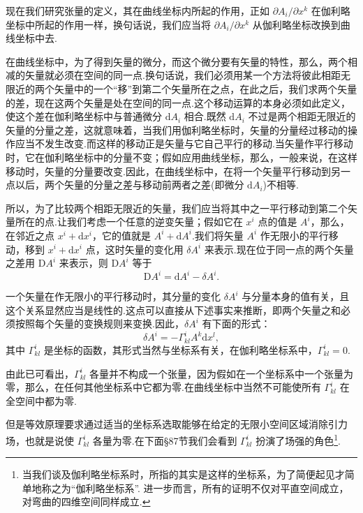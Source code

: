 现在我们研究张量的定义，其在曲线坐标内所起的作用，正如 $\partial A_i/\partial x^k$ 在伽利略坐标中所起的作用一样，换句话说，我们应当将 $\partial A_i/\partial x^k$ 从伽利略坐标改换到曲线坐标中去.

在曲线坐标中，为了得到矢量的微分，而这个微分要有矢量的特性，那么，两个相减的矢量就必须在空间的同一点.换句话说，我们必须用某一个方法将彼此相距无限近的两个矢量中的一个“移”到第二个矢量所在之点，在此之后，我们求两个矢量的差，现在这两个矢量是处在空间的同一点.这个移动运算的本身必须如此定义，使这个差在伽利略坐标中与普通微分 $\mathrm{d}A_i$ 相合.既然 $\mathrm{d}A_i$ 不过是两个相距无限近的矢量的分量之差，这就意味着，当我们用伽利略坐标时，矢量的分量经过移动的操作应当不发生改变.而这样的移动正是矢量与它自己平行的移动.当矢量作平行移动时，它在伽利略坐标中的分量不变；假如应用曲线坐标，那么，一般来说，在这样移动时，矢量的分量要改变.因此，在曲线坐标中，在将一个矢量平行移动到另一点以后，两个矢量的分量之差与移动前两者之差(即微分 $\mathrm{d}A_i$)不相等.

所以，为了比较两个相距无限近的矢量，我们应当将其中之一平行移动到第二个矢量所在的点.让我们考虑一个任意的逆变矢量；假如它在 $x^i$ 点的值是 $A^i$，那么，在邻近之点 $x^i+\mathrm{d}x^i$，它的值就是 $A^i+\mathrm{d}A^i$.我们将矢量 $A^i$ 作无限小的平行移动，移到 $x^i+\mathrm{d}x^i$ 点，这时矢量的变化用 $\delta A^i$ 来表示.现在位于同一点的两个矢量之差用 $\mathrm{D}A^i$ 来表示，则 $\mathrm{D}A^i$ 等于
\begin{equation}
  \mathrm{D}A^i=\mathrm{d}A^i-\delta A^i.
\end{equation}

一个矢量在作无限小的平行移动时，其分量的变化 $\delta A^i$ 与分量本身的值有关，且这个关系显然应当是线性的.这点可以直接从下述事实来推断，即两个矢量之和必须按照每个矢量的变换规则来变换.因此，$\delta A^i$ 有下面的形式：
\begin{equation}
  \delta A^i=-\Gamma^i_{kl}A^k\mathrm{d}x^l,
\end{equation}
其中 $\Gamma^i_{kl}$ 是坐标的函数，其形式当然与坐标系有关，在伽利略坐标系中，$\Gamma^i_{kl}=0$.

由此已可看出，$\Gamma^i_{kl}$ 各量并不构成一个张量，因为假如在一个坐标系中一个张量为零，那么，在任何其他坐标系中它都为零.在曲线坐标中当然不可能使所有 $\Gamma^i_{kl}$ 在全空间中都为零.

但是等效原理要求通过适当的坐标系选取能够在给定的无限小空间区域消除引力场，也就是说使 $\Gamma^i_{kl}$ 各量为零.在下面§87节我们会看到 $\Gamma^i_{kl}$ 扮演了场强的角色\footnote{当我们谈及伽利略坐标系时，所指的其实是这样的坐标系，为了简便起见才简单地称之为“伽利略坐标系”. 进一步而言，所有的证明不仅对平直空间成立，对弯曲的四维空间同样成立.}.

